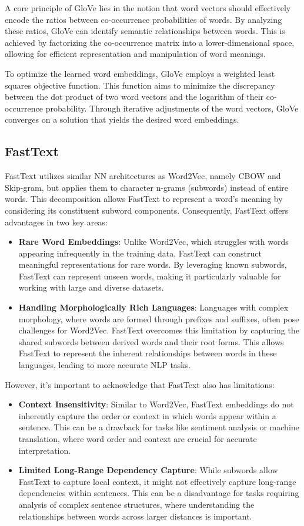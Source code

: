 A core principle of \ac{GloVe} lies in the notion that word vectors should effectively encode the ratios between co-occurrence probabilities of words.
By analyzing these ratios, \ac{GloVe} can identify semantic relationships between words.
This is achieved by factorizing the co-occurrence matrix into a lower-dimensional space, allowing for efficient representation and manipulation of word meanings.

To optimize the learned word embeddings, \ac{GloVe} employs a weighted least squares objective function.
This function aims to minimize the discrepancy between the dot product of two word vectors and the logarithm of their co-occurrence probability.
Through iterative adjustments of the word vectors, \ac{GloVe} converges on a solution that yields the desired word embeddings.

\subsection{FastText}
FastText \cite{bojanowski2017enriching} utilizes similar \ac{NN} architectures as Word2Vec, namely \ac{CBOW} and Skip-gram, but applies them to character n-grams (subwords) instead of entire words.
This decomposition allows FastText to represent a word's meaning by considering its constituent subword components.
Consequently, FastText offers advantages in two key areas:
\begin{itemize}
    \item \textbf{Rare Word Embeddings}: Unlike Word2Vec, which struggles with words appearing infrequently in the training data, FastText can construct meaningful representations for rare words. By leveraging known subwords, FastText can represent unseen words, making it particularly valuable for working with large and diverse datasets.    
    \item \textbf{Handling Morphologically Rich Languages}: Languages with complex morphology, where words are formed through prefixes and suffixes, often pose challenges for Word2Vec. FastText overcomes this limitation by capturing the shared subwords between derived words and their root forms. This allows FastText to represent the inherent relationships between words in these languages, leading to more accurate \ac{NLP} tasks.
\end{itemize}
However, it's important to acknowledge that FastText also has limitations:
\begin{itemize}
    \item \textbf{Context Insensitivity}: Similar to Word2Vec, FastText embeddings do not inherently capture the order or context in which words appear within a sentence. This can be a drawback for tasks like sentiment analysis or machine translation, where word order and context are crucial for accurate interpretation.
    \item \textbf{Limited Long-Range Dependency Capture}: While subwords allow FastText to capture local context, it might not effectively capture long-range dependencies within sentences. This can be a disadvantage for tasks requiring analysis of complex sentence structures, where understanding the relationships between words across larger distances is important.    
\end{itemize}

